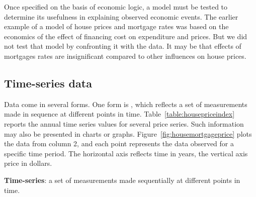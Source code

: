 Once specified on the basis of economic logic, a model must be tested to determine its usefulness in explaining observed economic events. The earlier example of a model of house prices and mortgage rates was based on the economics of the effect of financing cost on expenditure and prices. But we did not test that model by confronting it with the data. It may be that effects of mortgages rates are insignificant compared to other influences on house prices.  

\subsection*{Time-series data}

Data come in several forms. One form is , which reflects a set of measurements made in sequence at different points in time. Table~\ref{table:housepriceindex} reports the annual time series values for several price series. Such information may also be presented in charts or graphs. Figure~\ref{fig:housemortgageprice} plots the data from column 2, and each point represents the data observed for a specific time period. The horizontal axis reflects time in years, the vertical axis price in dollars.

\begin{DefBox}
\textbf{Time-series}: a set of measurements made sequentially at different points in time.
\end{DefBox}

